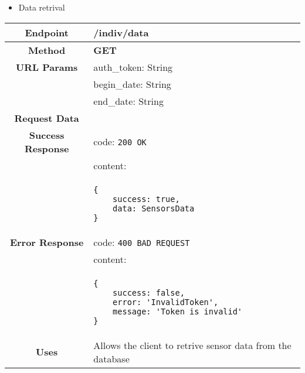     \begin{itemize}
        \item Data retrival
    \end{itemize}
    \begin{adjustwidth}{1cm}{}
        \begin{longtable}{|c|l|}
            \hline
            \textbf{Endpoint} & /indiv/data \\
            \hline
            \textbf{Method} & \textbf{GET} \\
            \hline
            \textbf{URL Params} &  auth\_token: String \\
            & begin\_date: String \\
            & end\_date: String \\
            \hline
            \textbf{Request Data} &  \\
            \hline
            \textbf{Success Response} & code: \texttt{200 OK} \\
            &                           content: \\
            & \begin{minipage}[t]{0.5\textwidth}
                \begin{adjustwidth}{1.5cm}{}
                \begin{verbatim}
{
    success: true, 
    data: SensorsData
}
                \end{verbatim}
                \end{adjustwidth}
              \end{minipage} \\
              \hline
            \textbf{Error Response} & code: \texttt{400 BAD REQUEST} \\
            &                         content: \\
            & \begin{minipage}[t]{0.7\textwidth}
                \begin{adjustwidth}{1.5cm}{}
                \begin{verbatim}
{
    success: false, 
    error: 'InvalidToken',
    message: 'Token is invalid'
}
                \end{verbatim}
                \end{adjustwidth}
              \end{minipage} \\
              \hline
            \textbf{Uses} & Allows the client to retrive sensor data from the database \\
            \hline
        \end{longtable}
    \end{adjustwidth}
    
